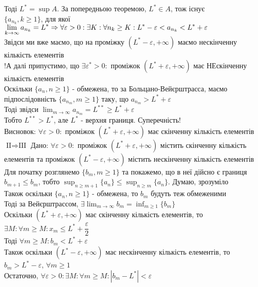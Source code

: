 \documentclass[a4paper, 14pt]{extarticle}
\def\huge{\displaystyle}
\def\bigline{\vspace{5mm}\\}
\def\bigline{\vspace{5mm}\\}
\begin{document}
	Тоді $L^* = \huge \sup A$. За попередньою теоремою, $L^* \in A$, тож існує \\ $\{a_{n_k}, k \geq 1\}$, для якої $\huge \lim_{k \to \infty} a_{n_k} = L^* \\ \Rightarrow \forall \varepsilon > 0: \exists K: \forall n_k \geq K: L^*-\varepsilon < a_{n_k} < L^*+\varepsilon$\\
	Звідси ми вже маємо, що на проміжку $(L^*-\varepsilon, +\infty)$ маємо нескінченну кількість елементів\\
	!А далі припустимо, що $\exists \varepsilon^* > 0:$ проміжок $(L^*+\varepsilon, + \infty)$ має НЕскінченну кількість елементів\\
	Оскільки $\{a_n, n \geq 1\}$ - обмежена, то за Больцано-Вейєрштрасса, маємо підпослідовність $\{a_{n_m}, m \geq 1\}$ таку, що $a_{n_m} > L^* + \varepsilon$\\
	Тоді звідси $\huge \lim_{m \to \infty} a_{n_m} = L^{**} \geq L^* + \varepsilon$\\
	Тобто $L^{**} > L^*$, але $L^*$ - верхня границя. Суперечність!\\
	Висновок: $\forall \varepsilon > 0:$ проміжок $(L^*+\varepsilon, + \infty)$ має скінченну кількість елементів
	\bigline
	$\boxed{\textrm{II} \Rightarrow \textrm{III}}$ Дано: $\forall \varepsilon > 0:$ проміжок $(L^*+\varepsilon, + \infty)$ містить скінченну кількість елементів та проміжок $(L^*-\varepsilon, + \infty)$ містить нескінченну кількість елементів\\
	Для початку розглянемо $\{b_m, m \geq 1\}$ та покажемо, що в неї дійсно є границя\\
	$b_{m+1} \leq b_m$, тобто $\huge \sup_{n \geq m+1} \{a_n\} \leq \sup_{n \geq m} \{a_n\}$. Думаю, зрозуміло\\
	Також оскільки $\{a_n, n \geq 1\}$ - обмежена, то $b_m$ будуть теж обмеженими\\
	Тоді за Вейєрштрассом, $\exists \huge \lim_{m \to \infty} b_m = \inf_{m \geq 1} \{b_m\}$\\
	Оскільки $(L^*+\varepsilon, + \infty)$ має скінченну кількість елементів, то $\exists M: \forall m \geq M: x_m \leq L^* + \dfrac{\varepsilon}{2}$\\
	Тоді $\forall m \geq M: b_m < L^* + \varepsilon$\\
	Також оскільки $(L^*-\varepsilon, + \infty)$ має нескінченну кількість елементів, то\\
	$b_m > L^* - \varepsilon$, $\forall m \geq 1$\\
	Остаточно, $\forall \varepsilon > 0: \exists M: \forall m \geq M: |b_m - L^*| < \varepsilon$\\
\end{document}
